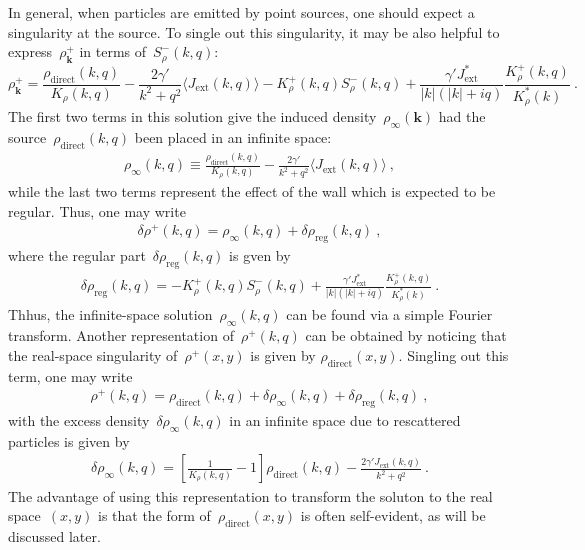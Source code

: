 \documentclass[preprint,aps,eqsecnum]{revtex4-1}
\newcommand{\fplus}[1]{{#1}^{+}}
\newcommand{\fminus}[1]{{#1}^{-}}
\newcommand{\dct}[1]{{#1}_\mathrm{direct}}
\begin{document}
In general, when particles
are emitted by point sources, one should expect a singularity
at the source. To single out this singularity,
it may be also helpful to express~$\fplus{\rho}_{\bm k}$
in terms of~$\fminus{S}_\rho(k, q)$:
\begin{equation}
  \label{eq:solution-rho-plus}
  \fplus{\rho}_{\bm k} = \frac{\dct{\rho}(k, q)}{K_\rho(k, q)}
    - \frac{2 \gamma'}{k^2 + q^2} \langle J_\mathrm{ext}(k, q) \rangle
  - \fplus{K}_\rho(k, q) \fminus{S}_\rho(k, q)
  + \frac{\gamma' J_\mathrm{ext}^\ast}{|k|(|k| + iq)}
     \frac{\fplus{K}_\rho(k, q)}{K_\rho^\ast(k)}
  \  .
\end{equation}
The first two terms in this solution give the induced
density~$\rho_\infty({\bm k})$  had the source~$\dct{\rho}(k, q)$
been placed in an infinite space:
\begin{align}
\rho_\infty(k, q) \equiv \frac{\dct{\rho}(k, q)}{K_\rho(k, q)}
- \frac{2\gamma'}{k^2 + q^2} \langle J_\mathrm{ext}(k, q)\rangle\ ,
\end{align}
 while the last two terms represent
the effect of the wall which is expected to be regular.
Thus, one may write
\begin{align}
  \delta\fplus{\rho}(k, q) = \rho_{\infty}(k, q) + \delta\rho_\mathrm{reg}(k, q)
  \ ,
\end{align}
where the regular part~$\delta\rho_\mathrm{reg}(k, q)$ is gven by
\begin{align}
  \label{eq:rho-reg}
 \delta\rho_\mathrm{reg}(k, q) =
  - \fplus{K}_\rho(k, q) 
\fminus{S}_\rho(k, q) + \frac{\gamma'J_\mathrm{ext}^\ast}{|k|(|k| + iq)}
\frac{\fplus{K}_\rho(k, q)}{K_\rho^\ast(k)}\ .
\end{align}
Thhus, the infinite-space solution~$\rho_\infty(k, q)$ can be found
via a simple Fourier transform.
Another representation of~$\fplus{\rho}(k, q)$ can be obtained by noticing that
the real-space singularity of~$\fplus{\rho}(x, y)$ is given by
$\dct{\rho}(x, y)$. Singling out this term, one may write
\begin{align}
  \label{eq:rho-decomp}
\fplus{\rho}(k, q) = \dct{\rho}(k, q)
 + \delta \rho_\infty(k, q) + \delta\rho_\mathrm{reg}(k, q)\ ,
\end{align}
with the excess density~$\delta\rho_\infty(k, q)$ in an infinite space
due to rescattered particles is given by
\begin{align}
  \label{eq:drho-inf}
\delta\rho_\infty(k, q) = \left[\frac{1}{K_\rho(k, q)} - 1\right]
\dct{\rho}(k, q)
- \frac{2\gamma' J_\mathrm{ext}(k, q)}{k^2 + q^2}\ . 
\end{align}
The advantage of using this representation to transform the soluton
to the real space~$(x, y)$ is that the 
form of~$\dct{\rho}(x, y)$ is often self-evident, as will be discussed
later.
\end{document}
